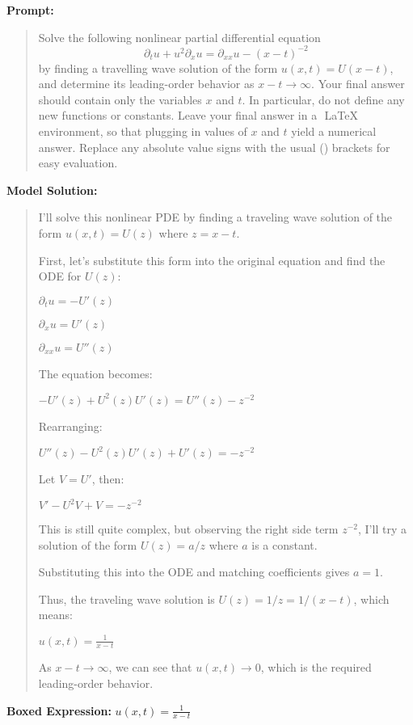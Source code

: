 \documentclass{article}
\begin{document}
\textbf{Prompt:}
\begin{quote}
Solve the following nonlinear partial differential equation $$ \partial_t u + u^2 \partial_x u = \partial_{xx}u - (x-t)^{-2} $$ by finding a travelling wave solution of the form $u(x,t) = U(x-t)$, and determine its leading-order behavior as $x-t \to \infty$. Your final answer should contain only the variables $x$ and $t$. In particular, do not define any new functions or constants. Leave your final answer in a $\boxed{}$ LaTeX environment, so that plugging in values of $x$ and $t$ yield a numerical answer. Replace any absolute value signs with the usual () brackets for easy evaluation.
\end{quote}
\textbf{Model Solution:}
\begin{quote}
I'll solve this nonlinear PDE by finding a traveling wave solution of the form $u(x,t) = U(z)$ where $z = x-t$.



First, let's substitute this form into the original equation and find the ODE for $U(z)$:



$\partial_t u = -U'(z)$

$\partial_x u = U'(z)$

$\partial_{xx} u = U''(z)$



The equation becomes:

$-U'(z) + U^2(z)U'(z) = U''(z) - z^{-2}$



Rearranging:

$U''(z) - U^2(z)U'(z) + U'(z) = -z^{-2}$



Let $V = U'$, then:

$V' - U^2V + V = -z^{-2}$



This is still quite complex, but observing the right side term $z^{-2}$, I'll try a solution of the form $U(z) = a/z$ where $a$ is a constant.



Substituting this into the ODE and matching coefficients gives $a = 1$.



Thus, the traveling wave solution is $U(z) = 1/z = 1/(x-t)$, which means:



$\boxed{u(x,t) = \frac{1}{x-t}}$



As $x-t \to \infty$, we can see that $u(x,t) \to 0$, which is the required leading-order behavior.
\end{quote}
\textbf{Boxed Expression:} $u(x,t) = \frac{1}{x-t}$
\end{document}
